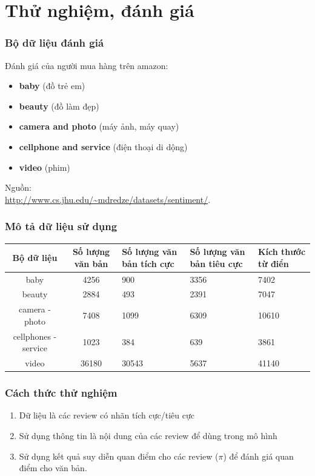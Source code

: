 \documentclass{beamer}
\newenvironment{localsize}[1]
{%
  \clearpage
  \let\orignewcommand\newcommand
  \let\newcommand\renewcommand
  \makeatletter
  \makeatother
  \let\newcommand\orignewcommand
}
{%
  \clearpage
}
\begin{document}
\section{Thử nghiệm, đánh giá}
\begin{frame}
\frametitle{Bộ dữ liệu đánh giá}
Đánh giá của người mua hàng trên amazon: 
\begin{itemize}
\item \textbf{baby}  (đồ trẻ em)
\item \textbf{beauty}  (đồ làm đẹp)
\item \textbf{camera and photo}  (máy ảnh, máy quay)
\item \textbf{cellphone and service}  (điện thoại di dộng)
\item \textbf{video}  (phim)
\end{itemize}
\begin{localsize}{10}
  Nguồn:\\ \url{http://www.cs.jhu.edu/~mdredze/datasets/sentiment/}. 
\end{localsize}

\end{frame}

\begin{frame}[shrink=30]
\frametitle{Mô tả dữ liệu sử dụng}
\begin{table}[htp!]
\centering 
\label{tab:dataset_description}
\begin{tabular}{|c|c|p{2cm}|p{2cm}|p{2.2cm}|}
\hline
 Bộ dữ liệu & Số lượng văn bản & Số lượng văn bản tích cực & Số lượng văn bản tiêu cực & Kích thước từ điển \\ \hline
baby & 4256 & 900 & 3356 & 7402\\ \hline 
beauty & 2884 & 493 & 2391 & 7047\\ \hline
camera - photo & 7408 & 1099 & 6309 & 10610\\ \hline 
cellphones - service & 1023 & 384 & 639 & 3861\\ \hline
video & 36180 & 30543 & 5637 & 41140\\ \hline
\end{tabular}
\end{table}
\end{frame}

\begin{frame}
\frametitle{Cách thức thử nghiệm}
\begin{enumerate}
\item Dữ liệu là các review có nhãn tích cực/tiêu cực
\item Sử dụng thông tin là nội dung của các review để dùng trong mô hình
\item Sử dụng kết quả suy diễn quan điểm cho các review ($\pi$) để đánh giá quan điểm cho văn bản.
\end{enumerate}
\end{frame}
\end{document}
